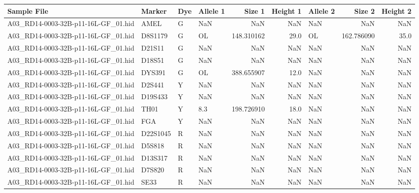 \begin{landscape}
\begin{table}[htbp]
\centering
\begin{tabular}{llllrrlrr}
\toprule
                        Sample File &   Marker & Dye & Allele 1 &     Size 1 &  Height 1 & Allele 2 &     Size 2 &  Height 2 \\
\midrule
A03\_RD14-0003-32B-p11-16L-GF\_01.hid &     AMEL &   G &      NaN &        NaN &       NaN &      NaN &        NaN &       NaN \\
A03\_RD14-0003-32B-p11-16L-GF\_01.hid &  D8S1179 &   G &       OL & 148.310162 &      29.0 &       OL & 162.786090 &      35.0 \\
A03\_RD14-0003-32B-p11-16L-GF\_01.hid &   D21S11 &   G &      NaN &        NaN &       NaN &      NaN &        NaN &       NaN \\
A03\_RD14-0003-32B-p11-16L-GF\_01.hid &   D18S51 &   G &      NaN &        NaN &       NaN &      NaN &        NaN &       NaN \\
A03\_RD14-0003-32B-p11-16L-GF\_01.hid &   DYS391 &   G &       OL & 388.655907 &      12.0 &      NaN &        NaN &       NaN \\
A03\_RD14-0003-32B-p11-16L-GF\_01.hid &   D2S441 &   Y &      NaN &        NaN &       NaN &      NaN &        NaN &       NaN \\
A03\_RD14-0003-32B-p11-16L-GF\_01.hid &  D19S433 &   Y &      NaN &        NaN &       NaN &      NaN &        NaN &       NaN \\
A03\_RD14-0003-32B-p11-16L-GF\_01.hid &     TH01 &   Y &      8.3 & 198.726910 &      18.0 &      NaN &        NaN &       NaN \\
A03\_RD14-0003-32B-p11-16L-GF\_01.hid &      FGA &   Y &      NaN &        NaN &       NaN &      NaN &        NaN &       NaN \\
A03\_RD14-0003-32B-p11-16L-GF\_01.hid & D22S1045 &   R &      NaN &        NaN &       NaN &      NaN &        NaN &       NaN \\
A03\_RD14-0003-32B-p11-16L-GF\_01.hid &   D5S818 &   R &      NaN &        NaN &       NaN &      NaN &        NaN &       NaN \\
A03\_RD14-0003-32B-p11-16L-GF\_01.hid &  D13S317 &   R &      NaN &        NaN &       NaN &      NaN &        NaN &       NaN \\
A03\_RD14-0003-32B-p11-16L-GF\_01.hid &   D7S820 &   R &      NaN &        NaN &       NaN &      NaN &        NaN &       NaN \\
A03\_RD14-0003-32B-p11-16L-GF\_01.hid &     SE33 &   R &      NaN &        NaN &       NaN &      NaN &        NaN &       NaN \\

\end{tabular}
\end{table}
\end{landscape}

